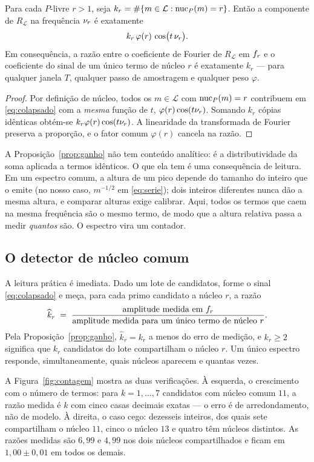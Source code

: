 \begin{proposicao}\label{prop:ganho}
Para cada $P$-livre $r>1$, seja $k_r=\#\{m\in\mathcal L:\operatorname{nuc}_P(m)=r\}$. Então a
componente de $R_{\mathcal L}$ na frequência $\nu_{r}$ é exatamente
\[
  k_r\,\varphi(r)\,\cos\bigl(t\,\nu_{r}\bigr).
\]
Em consequência, a razão entre o coeficiente de Fourier de $R_{\mathcal L}$ em
$f_{r}$ e o coeficiente do sinal de um único termo de núcleo $r$ é exatamente
$k_r$ — para qualquer janela $T$, qualquer passo de amostragem e qualquer peso
$\varphi$.
\end{proposicao}

\begin{proof}
Por definição de núcleo, todos os $m\in\mathcal L$ com $\operatorname{nuc}_P(m)=r$ contribuem
em \eqref{eq:colapsado} com a \emph{mesma} função de $t$,
$\varphi(r)\cos(t\nu_{r})$. Somando $k_r$ cópias idênticas obtém-se
$k_r\varphi(r)\cos(t\nu_{r})$. A linearidade da transformada de Fourier preserva
a proporção, e o fator comum $\varphi(r)$ cancela na razão.
\end{proof}

A Proposição~\ref{prop:ganho} não tem conteúdo analítico: é a distributividade da
soma aplicada a termos idênticos. O que ela tem é uma consequência de leitura. Em
um espectro comum, a altura de um pico depende do tamanho do inteiro que o emite
(no nosso caso, $m^{-1/2}$ em \eqref{eq:serie}); dois inteiros diferentes nunca dão
a mesma altura, e comparar alturas exige calibrar. Aqui, todos os termos que caem
na mesma frequência são o mesmo termo, de modo que a altura relativa passa a medir
\emph{quantos} são. O espectro vira um contador.

\subsection{O detector de núcleo comum}

A leitura prática é imediata. Dado um lote de candidatos, forme o sinal
\eqref{eq:colapsado} e meça, para cada primo candidato a núcleo $r$, a razão
\[
  \widehat{k}_r \;=\;
  \frac{\text{amplitude medida em } f_{r}}
       {\text{amplitude medida para um único termo de núcleo } r} .
\]
Pela Proposição~\ref{prop:ganho}, $\widehat k_r=k_r$ a menos do erro de medição, e
$k_r\ge2$ significa que $k_r$ candidatos do lote compartilham o núcleo $r$. Um
único espectro responde, simultaneamente, quais núcleos aparecem e quantas vezes.

A Figura~\ref{fig:contagem} mostra as duas verificações. À esquerda, o crescimento
com o número de termos: para $k=1,\dots,7$ candidatos com núcleo comum $11$, a
razão medida é $k$ com cinco casas decimais exatas — o erro é de arredondamento,
não de modelo. À direita, o caso cego: dezesseis inteiros, dos quais sete
compartilham o núcleo $11$, cinco o núcleo $13$ e quatro têm núcleos distintos. As
razões medidas são $6{,}99$ e $4{,}99$ nos dois núcleos compartilhados e ficam em
$1{,}00\pm0{,}01$ em todos os demais.

